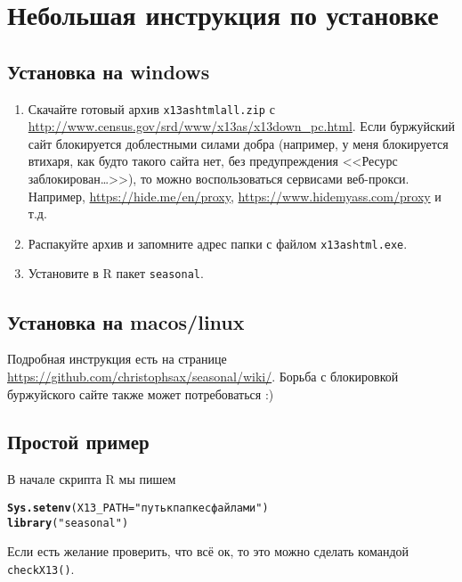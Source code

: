 \documentclass[final,pdftex]{../../template/epsilonj}\usepackage[]{graphicx}\usepackage[]{color}
\makeatletter
\newcommand{\hlstr}[1]{\textcolor[rgb]{0.192,0.494,0.8}{#1}}%
\newcommand{\hlstd}[1]{\textcolor[rgb]{0.345,0.345,0.345}{#1}}%
\newcommand{\hlkwc}[1]{\textcolor[rgb]{0.333,0.667,0.333}{#1}}%
\newcommand{\hlkwd}[1]{\textcolor[rgb]{0.737,0.353,0.396}{\textbf{#1}}}%
\newenvironment{kframe}{%
 \def\at@end@of@kframe{}%
 \ifinner\ifhmode%
  \def\at@end@of@kframe{\end{minipage}}%
  \begin{minipage}{\columnwidth}%
 \fi\fi%
 \def\FrameCommand##1{\hskip\@totalleftmargin \hskip-\fboxsep
 \colorbox{shadecolor}{##1}\hskip-\fboxsep
     \hskip-\linewidth \hskip-\@totalleftmargin \hskip\columnwidth}%
 \MakeFramed {\advance\hsize-\width
   \@totalleftmargin\z@ \linewidth\hsize
   \@setminipage}}%
 {\par\unskip\endMakeFramed%
 \at@end@of@kframe}
\newenvironment{knitrout}{}{} %
\makeatother
\begin{document}
\section{Небольшая инструкция по установке}


\subsection{Установка на windows}

\begin{enumerate}
\item Скачайте готовый архив \verb|x13ashtmlall.zip| с \url{http://www.census.gov/srd/www/x13as/x13down_pc.html}. Если буржуйский сайт блокируется доблестными силами добра (например, у меня блокируется втихаря, как будто такого сайта нет, без предупреждения <<Ресурс заблокирован\ldots>>), то можно воспользоваться сервисами веб-прокси. Например, \url{https://hide.me/en/proxy}, \url{https://www.hidemyass.com/proxy} и т.д.
\item Распакуйте архив и запомните адрес папки с файлом \verb|x13ashtml.exe|.
\item Установите в R пакет \verb|seasonal|.
\end{enumerate}

\subsection{Установка на macos/linux}

Подробная инструкция есть на странице \url{https://github.com/christophsax/seasonal/wiki/}. Борьба с блокировкой буржуйского сайте также может потребоваться :)


\subsection{Простой пример}
В начале скрипта R мы пишем
\begin{knitrout}
\color{fgcolor}\begin{kframe}
\begin{alltt}
\hlkwd{Sys.setenv}\hlstd{(}\hlkwc{X13_PATH} \hlstd{=}\hlstr{"путь к папке с файлами"}\hlstd{)}
\hlkwd{library}\hlstd{(}\hlstr{"seasonal"}\hlstd{)}
\end{alltt}
\end{kframe}
\end{knitrout}

Если есть желание проверить, что всё ок, то это можно сделать командой \verb|checkX13()|. 
\end{document}
